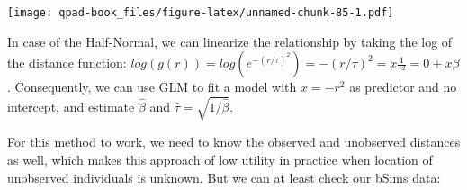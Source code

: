 \documentclass[12pt,]{book}
\newenvironment{Shaded}{\begin{snugshade}}{\end{snugshade}}
\newcommand{\ControlFlowTok}[1]{\textcolor[rgb]{0.13,0.29,0.53}{\textbf{#1}}}
\newcommand{\DataTypeTok}[1]{\textcolor[rgb]{0.13,0.29,0.53}{#1}}
\newcommand{\DecValTok}[1]{\textcolor[rgb]{0.00,0.00,0.81}{#1}}
\newcommand{\KeywordTok}[1]{\textcolor[rgb]{0.13,0.29,0.53}{\textbf{#1}}}
\newcommand{\NormalTok}[1]{#1}
\newcommand{\OperatorTok}[1]{\textcolor[rgb]{0.81,0.36,0.00}{\textbf{#1}}}
\newcommand{\OtherTok}[1]{\textcolor[rgb]{0.56,0.35,0.01}{#1}}
\newcommand{\StringTok}[1]{\textcolor[rgb]{0.31,0.60,0.02}{#1}}
\begin{document}
\begin{Shaded}
\end{Shaded}

\texttt{[image: qpad-book\_files/figure-latex/unnamed-chunk-85-1.pdf]}

In case of the Half-Normal, we can linearize the relationship
by taking the log of the distance function:
\(log(g(r)) =log(e^{-(r/\tau)^2})= -(r / \tau)^2 = x \frac{1}{\tau^2} = 0 + x \beta\).
Consequently, we can use GLM to fit a model with \(x = -r^2\) as
predictor and no intercept, and estimate \(\hat{\beta}\) and
\(\hat{\tau}=\sqrt{1/\hat{\beta}}\).

For this method to work, we need to know the observed and
unobserved distances as well,
which makes this approach of low utility in practice when
location of unobserved individuals is unknown.
But we can at least check our bSims data:

\begin{Shaded}
\end{Shaded}
\end{document}
